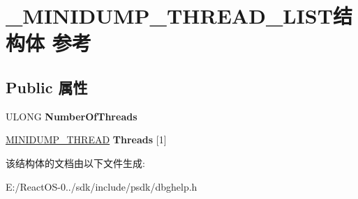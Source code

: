 \hypertarget{struct___m_i_n_i_d_u_m_p___t_h_r_e_a_d___l_i_s_t}{}\section{\+\_\+\+M\+I\+N\+I\+D\+U\+M\+P\+\_\+\+T\+H\+R\+E\+A\+D\+\_\+\+L\+I\+S\+T结构体 参考}
\label{struct___m_i_n_i_d_u_m_p___t_h_r_e_a_d___l_i_s_t}
\subsection*{Public 属性}
\begin{DoxyCompactItemize}
\item 
\mbox{\label{struct___m_i_n_i_d_u_m_p___t_h_r_e_a_d___l_i_s_t_a1d1032a091d756563df2c89728af7090}} 
U\+L\+O\+NG {\bfseries Number\+Of\+Threads}
\item 
\mbox{\label{struct___m_i_n_i_d_u_m_p___t_h_r_e_a_d___l_i_s_t_a9fa52ec2ecddd4034a716636aaa1c685}} 
\hyperlink{struct___m_i_n_i_d_u_m_p___t_h_r_e_a_d}{M\+I\+N\+I\+D\+U\+M\+P\+\_\+\+T\+H\+R\+E\+AD} {\bfseries Threads} \mbox{[}1\mbox{]}
\end{DoxyCompactItemize}


该结构体的文档由以下文件生成\+:\begin{DoxyCompactItemize}
\item 
E\+:/\+React\+O\+S-\/0../sdk/include/psdk/dbghelp.\+h\end{DoxyCompactItemize}
